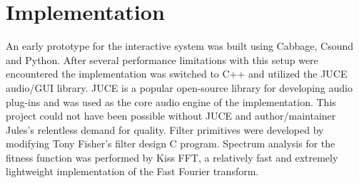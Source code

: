 \documentclass[12pt]{article}
\begin{document}
\begin{comment}
\subsection{Experimental Setup}
\subsubsection{Method}
This experiment will use genetic programming to evolve synthesis algorithms directly, utilizing any set of primitives that the user chooses. The inputs to this system will be the user-selected primitives and the output will be multiple SSA's for the user to modify and evaluate. The user will be able to step through the evolutionary process, assigning fitness and auditioning the produced SSA's using a MIDI keyboard or virtual MIDI keyboard. The user may manipulate any variable constants of the produced SSA. The user may opt to input an audio file and let the synthesizer attempt to evolve towards it. The user may also let evolution experiment randomly using novelty search with unencountered fundamental/partial frequency ratios as the novelty goal.
\subsubsection{Results}
\subsubsection{Identified Limitations}
\subsubsection{Conclusions}
\subsubsection{Parameters}

\end{comment}

\section{Implementation}
An early prototype for the interactive system was built using Cabbage, Csound and Python. After several performance limitations with this setup were encountered the implementation was switched to C++ and utilized the JUCE audio/GUI library. JUCE is a popular open-source library for developing audio plug-ins and was used as the core audio engine of the implementation. This project could not have been possible without JUCE and author/maintainer Jules's relentless demand for quality. Filter primitives were developed by modifying Tony Fisher's filter design C program. Spectrum analysis for the fitness function was performed by Kiss FFT, a relatively fast and extremely lightweight implementation of the Fast Fourier transform.
\end{document}
